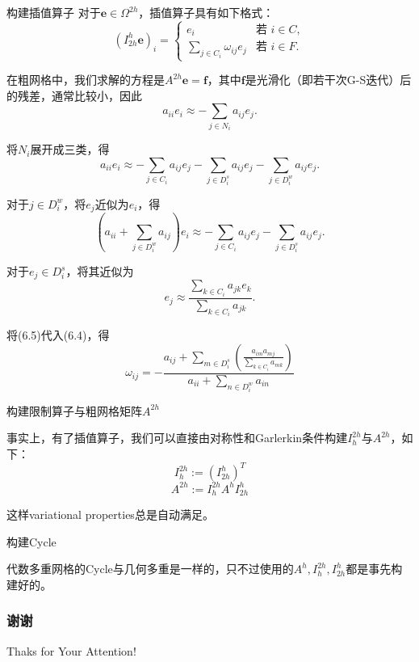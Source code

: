 \documentclass[9pt]{beamer}
\begin{document}
\begin{frame}{构建插值算子}
\tiny
对于$\mathbf{e}\in\Omega^{2h}$，插值算子具有如下格式：
\begin{equation}
  (I_{2h}^h \mathbf{e})_i=\left\{
    \begin{array}{ll}
      e_i & \text{若 }i\in C,\\
      \sum_{j\in C_i}\omega_{ij}e_j & \text{若 }i\in F.
    \end{array}
  \right.
\end{equation}

\pause
在粗网格中，我们求解的方程是$A^{2h}\mathbf{e}=\mathbf{f}$，其中$\mathbf{f}$是光滑化（即若干次G-S迭代）后的残差，通常比较小，因此
\begin{equation*}
  a_{ii}e_i\approx -\sum_{j\in N_i} a_{ij}e_j.
\end{equation*}

\pause
将$N_i$展开成三类，得
\begin{equation}
  a_{ii}e_i\approx -\sum_{j\in C_i} a_{ij}e_j -\sum_{j\in D^s_i} a_{ij}e_j -\sum_{j\in D^w_i} a_{ij}e_j.
\end{equation}

\pause
对于$j\in D^w_i$，将$e_j$近似为$e_i$，得
\begin{equation}
  \left(a_{ii}+\sum_{j\in D^w_i} a_{ij}\right)e_i\approx -\sum_{j\in C_i} a_{ij}e_j -\sum_{j\in D^s_i} a_{ij}e_j.
\end{equation}

\pause
对于$e_j\in D_i^s$，将其近似为
\begin{equation}
  e_j\approx \frac{\sum_{k\in C_i} a_{jk}e_k}{\sum_{k\in C_i} a_{jk}}.
\end{equation}

\pause
将(6.5)代入(6.4)，得
\begin{equation}
  \omega_{ij}=-\frac{a_{ij}+\sum\limits_{m\in D_i^s}\left(\frac{a_{im}a_{mj}}{\sum\limits_{k\in C_i} a_{mk}}\right)}{a_{ii}+\sum\limits_{n\in D_i^w} a_{in}}
\end{equation}

\end{frame}

\begin{frame}{构建限制算子与粗网格矩阵$A^{2h}$}

事实上，有了插值算子，我们可以直接由对称性和Garlerkin条件构建$I_{h}^{2h}$与$A^{2h}$，如下：
\begin{equation}
  I_{h}^{2h}:=(I_{2h}^{h})^T
\end{equation}
\begin{equation}
  A^{2h}:=I_{h}^{2h}A^hI_{2h}^{h}
\end{equation}

\vspace{1em}
这样variational properties总是自动满足。

\end{frame}

\begin{frame}{构建Cycle}

代数多重网格的Cycle与几何多重是一样的，只不过使用的$A^h,I_h^{2h},I_{2h}^h$都是事先构建好的。

\end{frame}


\begin{frame}
    \frametitle{谢谢}
    \centering
    \Large Thaks for Your Attention!
\end{frame}
\end{document}
